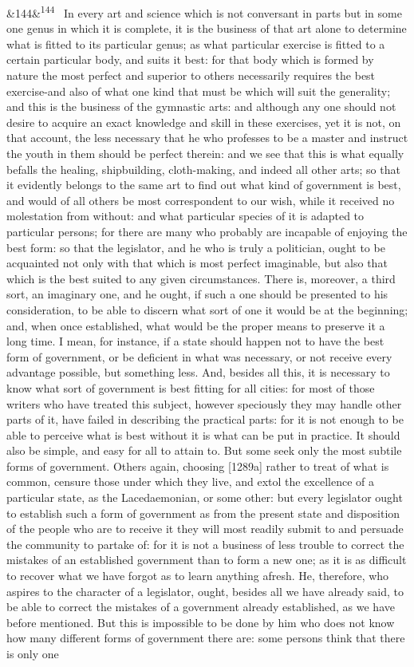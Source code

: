 \documentclass[12pt]{article}
\newcommand{\para}[1][]{\par\noindent\ifx&#1&\else\textsuperscript{\footnotesize #1}~\fi}
\begin{document}
\para[144] In every art and science which is not conversant in parts but in some one genus in which it is complete, it is the business of that art alone to determine what is fitted to its particular genus; as what particular exercise is fitted to a certain particular body, and suits it best: for that body which is formed by nature the most perfect and superior to others necessarily requires the best exercise-and also of what one kind that must be which will suit the generality; and this is the business of the gymnastic arts: and although any one should not desire to acquire an exact knowledge and skill in these exercises, yet it is not, on that account, the less necessary that he who professes to be a master and instruct the youth in them should be perfect therein: and we see that this is what equally befalls the healing, shipbuilding, cloth-making, and indeed all other arts; so that it evidently belongs to the same art to find out what kind of government is best, and would of all others be most correspondent to our wish, while it received no molestation from without: and what particular species of it is adapted to particular persons; for there are many who probably are incapable of enjoying the best form: so that the legislator, and he who is truly a politician, ought to be acquainted not only with that which is most perfect imaginable, but also that which is the best suited to any given circumstances. There is, moreover, a third sort, an imaginary one, and he ought, if such a one should be presented to his consideration, to be able to discern what sort of one it would be at the beginning; and, when once established, what would be the proper means to preserve it a long time. I mean, for instance, if a state should happen not to have the best form of government, or be deficient in what was necessary, or not receive every advantage possible, but something less. And, besides all this, it is necessary to know what sort of government is best fitting for all cities: for most of those writers who have treated this subject, however speciously they may handle other parts of it, have failed in describing the practical parts: for it is not enough to be able to perceive what is best without it is what can be put in practice. It should also be simple, and easy for all to attain to. But some seek only the most subtile forms of government. Others again, choosing [1289a] rather to treat of what is common, censure those under which they live, and extol the excellence of a particular state, as the Lacedaemonian, or some other: but every legislator ought to establish such a form of government as from the present state and disposition of the people who are to receive it they will most readily submit to and persuade the community to partake of: for it is not a business of less trouble to correct the mistakes of an established government than to form a new one; as it is as difficult to recover what we have forgot as to learn anything afresh. He, therefore, who aspires to the character of a legislator, ought, besides all we have already said, to be able to correct the mistakes of a government already established, as we have before mentioned. But this is impossible to be done by him who does not know how many different forms of government there are: some persons think that there is only one 
\end{document}
